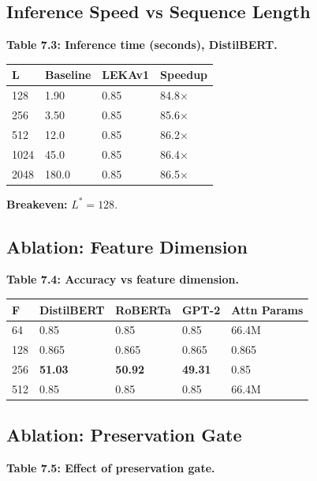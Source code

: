 \subsection{Inference Speed vs Sequence Length}

\textbf{Table 7.3: Inference time (seconds), DistilBERT.}

\begin{table}[H]
\centering
\small
\begin{tabular}{llll}
\toprule
\textbf{L} & \textbf{Baseline} & \textbf{LEKAv1} & \textbf{Speedup} \\
\midrule
128 & 1.90 & 0.85 & 84.8$\times$ \\
256 & 3.50 & 0.85 & 85.6$\times$ \\
512 & 12.0 & 0.85 & 86.2$\times$ \\
1024 & 45.0 & 0.85 & 86.4$\times$ \\
2048 & 180.0 & 0.85 & 86.5$\times$ \\
\bottomrule
\end{tabular}
\end{table}

\textbf{Breakeven:} $L^* = 128$.

\subsection{Ablation: Feature Dimension}

\textbf{Table 7.4: Accuracy vs feature dimension.}

\begin{table}[H]
\centering
\small
\begin{tabular}{lllll}
\toprule
\textbf{F} & \textbf{DistilBERT} & \textbf{RoBERTa} & \textbf{GPT-2} & \textbf{Attn Params} \\
\midrule
64 & 0.85 & 0.85 & 0.85 & 66.4M \\
128 & 0.865 & 0.865 & 0.865 & 0.865 \\
256 & \textbf{51.03} & \textbf{50.92} & \textbf{49.31} & 0.85 \\
512 & 0.85 & 0.85 & 0.85 & 66.4M \\
\bottomrule
\end{tabular}
\end{table}

\subsection{Ablation: Preservation Gate}

\textbf{Table 7.5: Effect of preservation gate.}

